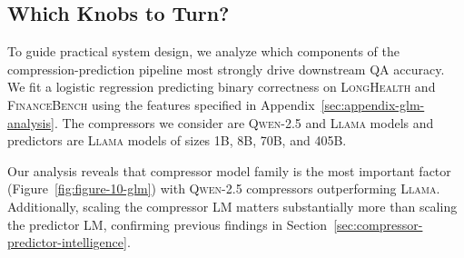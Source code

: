 \documentclass{article} %
\begin{document}
\subsection{Which Knobs to Turn?}
\label{sec:glm-analysis}

To guide practical system design, we analyze which components of the compression-prediction pipeline most strongly drive downstream QA accuracy. We fit a logistic regression predicting binary correctness on \textsc{LongHealth} and \textsc{FinanceBench} using the features specified in Appendix~\ref{sec:appendix-glm-analysis}. The compressors we consider are \textsc{Qwen-2.5} and \textsc{Llama} models and predictors are \textsc{Llama} models of sizes 1B, 8B, 70B, and 405B.

Our analysis reveals that compressor model family is the most important factor (Figure~\ref{fig:figure-10-glm}) with \textsc{Qwen-2.5} compressors outperforming \textsc{Llama}. Additionally, scaling the compressor LM matters substantially more than scaling the predictor LM, confirming previous findings in Section~\ref{sec:compressor-predictor-intelligence}.




\end{document}
